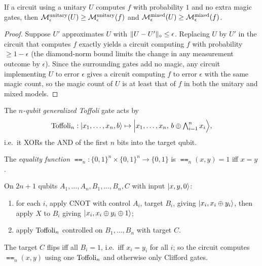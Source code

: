 \begin{lemma}
  \label{lem:unitary-computes-f}
  If a circuit using a unitary $U$ computes $f$ with probability $1$ and no extra
  magic gates, then $\mathcal{M}^{\mathrm{unitary}}_\epsilon(U) \ge \mathcal{M}^{\mathrm{unitary}}_\epsilon(f)$ and $\mathcal{M}^{\mathrm{mixed}}_\epsilon(U)
  \ge \mathcal{M}^{\mathrm{mixed}}_\epsilon(f)$.
\end{lemma}
\begin{proof}
  Suppose $U'$ approximates $U$ with $\lVert U-U' \rVert_{\diamond}\le\epsilon$. Replacing $U$ by
  $U'$ in the circuit that computes $f$ exactly yields a circuit computing $f$
  with probability $\ge 1-\epsilon$ (the diamond-norm bound limits the change in
  any measurement outcome by $\epsilon$). Since the surrounding gates add no
  magic, any circuit implementing $U$ to error $\epsilon$ gives a circuit
  computing $f$ to error $\epsilon$ with the same magic count, so the magic count
  of $U$ is at least that of $f$ in both the unitary and mixed models.
\end{proof}

\begin{definition}
  \label{def:toffoli}
  The \emph{$n$-qubit generalized Toffoli} gate acts by
  \[
    \mathrm{Toffoli}_n : \lvert x_1,\dots,x_n,b\rangle \mapsto
      \Big\lvert x_1,\dots,x_n,\, b \oplus \textstyle\bigwedge_{i=1}^n x_i
      \Big\rangle,
  \]
  i.e.\ it XORs the AND of the first $n$ bits into the target qubit.
\end{definition}

\begin{definition}
  \label{def:equality}
  The \emph{equality function} $\Equal_n : \{0,1\}^n\times\{0,1\}^n\to\{0,1\}$ is
  $\Equal_n(x,y) = 1$ iff $x = y$.
\end{definition}

\begin{construction}
  \label{constr:toffoli-equality}
  On $2n+1$ qubits $A_1,\dots,A_n, B_1,\dots,B_n, C$ with input $\lvert x,y,0\rangle$:
  \begin{enumerate}
    \item for each $i$, apply CNOT with control $A_i$, target $B_i$, giving
      $\lvert x_i, x_i\oplus y_i\rangle$, then apply $X$ to $B_i$ giving
      $\lvert x_i, x_i\oplus y_i\oplus 1\rangle$;
    \item apply $\mathrm{Toffoli}_n$ controlled on $B_1,\dots,B_n$ with target $C$.
  \end{enumerate}
  The target $C$ flips iff all $B_i = 1$, i.e.\ iff $x_i = y_i$ for all $i$; so
  the circuit computes $\Equal_n(x,y)$ using one $\mathrm{Toffoli}_n$ and otherwise only
  Clifford gates.
\end{construction}

